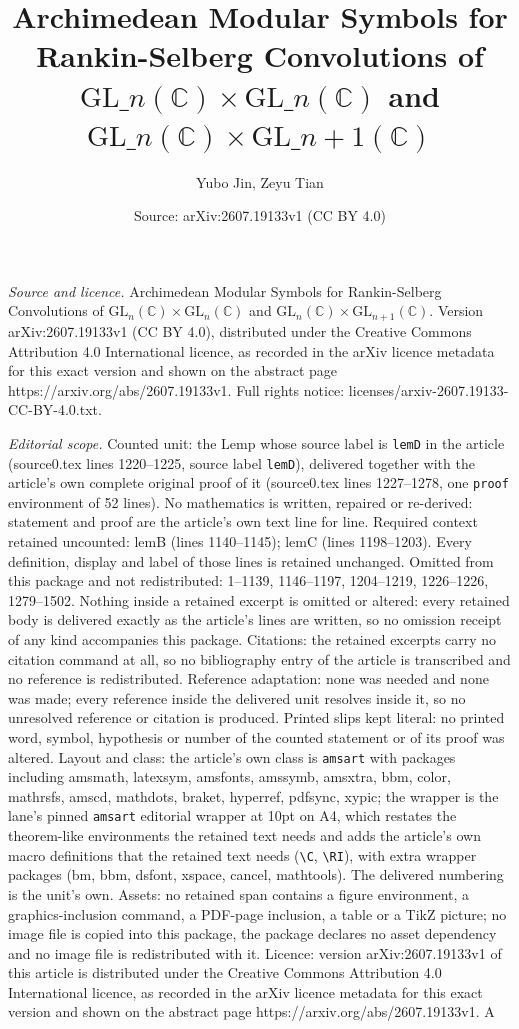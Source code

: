 \documentclass[10pt,a4paper]{amsart}
\title[Archimedean Modular Symbols for Rankin-Selberg Convolutions ]{Archimedean Modular Symbols for Rankin-Selberg Convolutions of $\mathrm{GL}\_n(\mathbb{C})\times\mathrm{GL}\_n(\mathbb{C})$ and $\mathrm{GL}\_n(\mathbb{C})\times\mathrm{GL}\_{n+1}(\mathbb{C})$}
\author{Yubo Jin, Zeyu Tian}
\date{Source: arXiv:2607.19133v1 (CC BY 4.0)}
\begin{document}
\maketitle

\noindent\emph{Source and licence.} Archimedean Modular Symbols for Rankin-Selberg Convolutions of $\mathrm{GL}_n(\mathbb{C})\times\mathrm{GL}_n(\mathbb{C})$ and $\mathrm{GL}_n(\mathbb{C})\times\mathrm{GL}_{n+1}(\mathbb{C})$. Version arXiv:2607.19133v1 (CC BY 4.0), distributed under the Creative Commons Attribution 4.0 International licence, as recorded in the arXiv licence metadata for this exact version and shown on the abstract page https://arxiv.org/abs/2607.19133v1. Full rights notice: licenses/arxiv-2607.19133-CC-BY-4.0.txt.\par\smallskip

\noindent\textit{Editorial scope.} Counted unit: the Lemp whose source label is \texttt{lemD} in the article (source0.tex lines 1220--1225, source label \texttt{lemD}), delivered together with the article's own complete original proof of it (source0.tex lines 1227--1278, one \texttt{proof} environment of 52 lines). No mathematics is written, repaired or re-derived: statement and proof are the article's own text line for line. Required context retained uncounted: lemB (lines 1140--1145); lemC (lines 1198--1203). Every definition, display and label of those lines is retained unchanged. Omitted from this package and not redistributed: 1--1139, 1146--1197, 1204--1219, 1226--1226, 1279--1502. Nothing inside a retained excerpt is omitted or altered: every retained body is delivered exactly as the article's lines are written, so no omission receipt of any kind accompanies this package. Citations: the retained excerpts carry no citation command at all, so no bibliography entry of the article is transcribed and no reference is redistributed. Reference adaptation: none was needed and none was made; every reference inside the delivered unit resolves inside it, so no unresolved reference or citation is produced. Printed slips kept literal: no printed word, symbol, hypothesis or number of the counted statement or of its proof was altered. Layout and class: the article's own class is \texttt{amsart} with packages including amsmath, latexsym, amsfonts, amssymb, amsxtra, bbm, color, mathrsfs, amscd, mathdots, braket, hyperref, pdfsync, xypic; the wrapper is the lane's pinned \texttt{amsart} editorial wrapper at 10pt on A4, which restates the theorem-like environments the retained text needs and adds the article's own macro definitions that the retained text needs (\texttt{\textbackslash C}, \texttt{\textbackslash RI}), with extra wrapper packages (bm, bbm, dsfont, xspace, cancel, mathtools). The delivered numbering is the unit's own. Assets: no retained span contains a figure environment, a graphics-inclusion command, a PDF-page inclusion, a table or a TikZ picture; no image file is copied into this package, the package declares no asset dependency and no image file is redistributed with it. Licence: version arXiv:2607.19133v1 of this article is distributed under the Creative Commons Attribution 4.0 International licence, as recorded in the arXiv licence metadata for this exact version and shown on the abstract page https://arxiv.org/abs/2607.19133v1. A 
\end{document}
